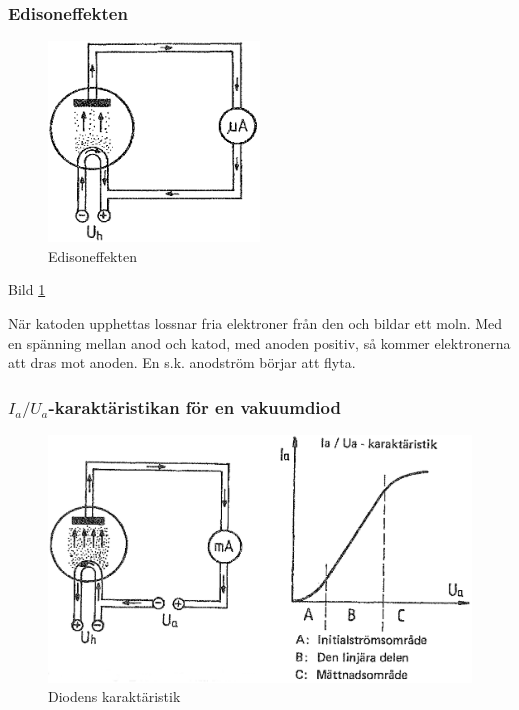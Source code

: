 \subsubsection{Edisoneffekten}

\begin{figure}
\includegraphics[width=0.5\textwidth]{images/bild_2_2-25.png}
\caption{Edisoneffekten}
\label{fig:BildII2-25}
\end{figure}

Bild \ref{fig:BildII2-25}

När katoden upphettas lossnar fria elektroner från den och bildar ett moln. Med
en spänning mellan anod och katod, med anoden positiv, så kommer elektronerna
att dras mot anoden. En s.k. anodström börjar att flyta.

\subsubsection{\(I_a/U_a\)-karaktäristikan för en vakuumdiod}

\begin{figure}
\includegraphics[width=\textwidth]{images/bild_2_2-26.png}
\caption{Diodens karaktäristik}
\label{fig:BildII2-26}
\end{figure}

